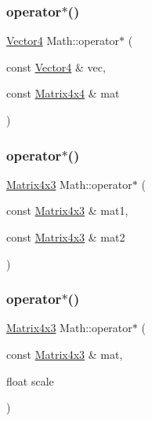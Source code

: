 \mbox{\label{namespace_math_a4d7db6c4bdacba08e4a5488fe9643450}} 
\subsubsection{\texorpdfstring{operator$\ast$()}{operator*()}\hspace{0.1cm}{\footnotesize\ttfamily [11/19]}}
{\footnotesize\ttfamily \mbox{\hyperlink{struct_math_1_1_vector4}{Vector4}} Math\+::operator$\ast$ (\begin{DoxyParamCaption}\item[{const \mbox{\hyperlink{struct_math_1_1_vector4}{Vector4}} \&}]{vec,  }\item[{const \mbox{\hyperlink{struct_math_1_1_matrix4x4}{Matrix4x4}} \&}]{mat }\end{DoxyParamCaption})}

\mbox{\label{namespace_math_a231015e930e4e65cfeb4d3ed35c5f60b}} 
\subsubsection{\texorpdfstring{operator$\ast$()}{operator*()}\hspace{0.1cm}{\footnotesize\ttfamily [12/19]}}
{\footnotesize\ttfamily \mbox{\hyperlink{struct_math_1_1_matrix4x3}{Matrix4x3}} Math\+::operator$\ast$ (\begin{DoxyParamCaption}\item[{const \mbox{\hyperlink{struct_math_1_1_matrix4x3}{Matrix4x3}} \&}]{mat1,  }\item[{const \mbox{\hyperlink{struct_math_1_1_matrix4x3}{Matrix4x3}} \&}]{mat2 }\end{DoxyParamCaption})}

\mbox{\label{namespace_math_a9c473bb33aae64090197e0d686ad75c3}} 
\subsubsection{\texorpdfstring{operator$\ast$()}{operator*()}\hspace{0.1cm}{\footnotesize\ttfamily [13/19]}}
{\footnotesize\ttfamily \mbox{\hyperlink{struct_math_1_1_matrix4x3}{Matrix4x3}} Math\+::operator$\ast$ (\begin{DoxyParamCaption}\item[{const \mbox{\hyperlink{struct_math_1_1_matrix4x3}{Matrix4x3}} \&}]{mat,  }\item[{float}]{scale }\end{DoxyParamCaption})}

